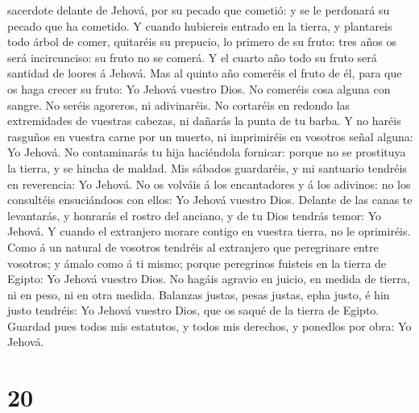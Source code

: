sacerdote delante de Jehová, por su pecado que cometió: y se le
perdonará su pecado que ha cometido.  Y cuando hubiereis
entrado en la tierra, y plantareis todo árbol de comer, quitaréis su
prepucio, lo primero de su fruto: tres años os será incircunciso: su
fruto no se comerá.  Y el cuarto año todo su fruto será
santidad de loores á Jehová.  Mas al quinto año comeréis el
fruto de él, para que os haga crecer su fruto: Yo Jehová vuestro Dios.
 No comeréis cosa alguna con sangre. No seréis agoreros, ni
adivinaréis.  No cortaréis en redondo las extremidades de
vuestras cabezas, ni dañarás la punta de tu barba.  Y no
haréis rasguños en vuestra carne por un muerto, ni imprimiréis en
vosotros señal alguna: Yo Jehová.  No contaminarás tu hija
haciéndola fornicar: porque no se prostituya la tierra, y se hincha de
maldad.  Mis sábados guardaréis, y mi santuario tendréis en
reverencia: Yo Jehová.  No os volváis á los encantadores y
á los adivinos: no los consultéis ensuciándoos con ellos: Yo Jehová
vuestro Dios.  Delante de las canas te levantarás, y
honrarás el rostro del anciano, y de tu Dios tendrás temor: Yo Jehová.
 Y cuando el extranjero morare contigo en vuestra tierra,
no le oprimiréis.  Como á un natural de vosotros tendréis
al extranjero que peregrinare entre vosotros; y ámalo como á ti mismo;
porque peregrinos fuisteis en la tierra de Egipto: Yo Jehová vuestro
Dios.  No hagáis agravio en juicio, en medida de tierra, ni
en peso, ni en otra medida.  Balanzas justas, pesas justas,
epha justo, é hin justo tendréis: Yo Jehová vuestro Dios, que os saqué
de la tierra de Egipto.  Guardad pues todos mis estatutos,
y todos mis derechos, y ponedlos por obra: Yo Jehová.

\hypertarget{section-19}{%
\section{20}\label{section-19}}

